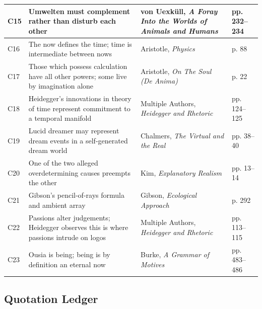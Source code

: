 \begin{center}
\begin{tabular}{|l|l|l|l|}
\hline
C15 & Umwelten must complement rather than disturb each other & von Uexküll, \textit{A Foray Into the Worlds of Animals and Humans} & pp. 232--234 \\
\hline
C16 & The now defines the time; time is intermediate between nows & Aristotle, \textit{Physics} & p. 88 \\
\hline
C17 & Those which possess calculation have all other powers; some live by imagination alone & Aristotle, \textit{On The Soul (De Anima)} & p. 22 \\
\hline
C18 & Heidegger's innovations in theory of time represent commitment to a temporal manifold & Multiple Authors, \textit{Heidegger and Rhetoric} & pp. 124--125 \\
\hline
C19 & Lucid dreamer may represent dream events in a self-generated dream world & Chalmers, \textit{The Virtual and the Real} & pp. 38--40 \\
\hline
C20 & One of the two alleged overdetermining causes preempts the other & Kim, \textit{Explanatory Realism} & pp. 13--14 \\
\hline
C21 & Gibson's pencil-of-rays formula and ambient array & Gibson, \textit{Ecological Approach} & p. 292 \\
\hline
C22 & Passions alter judgements; Heidegger observes this is where passions intrude on logos & Multiple Authors, \textit{Heidegger and Rhetoric} & pp. 113--115 \\
\hline
C23 & Ousia is being; being is by definition an eternal now & Burke, \textit{A Grammar of Motives} & pp. 483--486 \\
\hline
\end{tabular}
\end{center}

\subsection*{Quotation Ledger}

